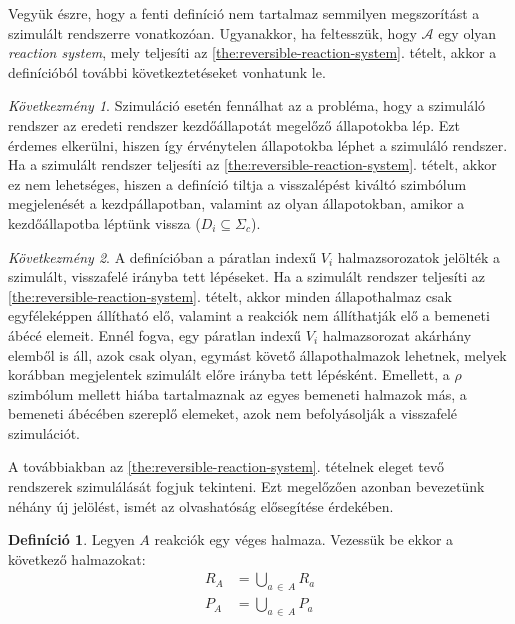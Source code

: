 \documentclass[12pt]{article}
\theoremstyle{definition}
\newtheorem*{definition*}{Definíció}
\theoremstyle{remark}
\theoremstyle{plain}
\theoremstyle{remark}
\newtheorem*{corollary*}{Következmény}
\theoremstyle{plain}
\begin{document}
    Vegyük észre, hogy a fenti definíció nem tartalmaz semmilyen megszorítást a szimulált rendszerre vonatkozóan. Ugyanakkor, ha feltesszük, hogy $\mathscr{A}$ egy olyan \textit{reaction system}, mely teljesíti az \ref{the:reversible-reaction-system}. tételt, akkor a definícióból további következtetéseket vonhatunk le.

    \begin{corollary*}
        Szimuláció esetén fennálhat az a probléma, hogy a szimuláló rendszer az eredeti rendszer kezdőállapotát megelőző állapotokba lép. Ezt érdemes elkerülni, hiszen így érvénytelen állapotokba léphet a szimuláló rendszer. Ha a szimulált rendszer teljesíti az \ref{the:reversible-reaction-system}. tételt, akkor ez nem lehetséges, hiszen a definíció tiltja a visszalépést kiváltó szimbólum megjelenését a kezdpállapotban, valamint az olyan állapotokban, amikor a kezdőállapotba léptünk vissza ($D_{i} \subseteq \Sigma_{c}$).
    \end{corollary*}

    \begin{corollary*}
        A definícióban a páratlan indexű $V_{i}$ halmazsorozatok jelölték a szimulált, visszafelé irányba tett lépéseket. Ha a szimulált rendszer teljesíti az \ref{the:reversible-reaction-system}. tételt, akkor minden állapothalmaz csak egyféleképpen állítható elő, valamint a reakciók nem állíthatják elő a bemeneti ábécé elemeit. Ennél fogva, egy páratlan indexű $V_{i}$ halmazsorozat akárhány elemből is áll, azok csak olyan, egymást követő állapothalmazok lehetnek, melyek korábban megjelentek szimulált előre irányba tett lépésként. Emellett, a $\rho$ szimbólum mellett hiába tartalmaznak az egyes bemeneti halmazok más, a bemeneti ábécében szereplő elemeket, azok nem befolyásolják a visszafelé szimulációt.
    \end{corollary*}

    A továbbiakban az \ref{the:reversible-reaction-system}. tételnek eleget tevő rendszerek szimulálását fogjuk tekinteni. Ezt megelőzően azonban bevezetünk néhány új jelölést, ismét az olvashatóság elősegítése érdekében.

    \begin{definition*}
        Legyen $A$ reakciók egy véges halmaza. Vezessük be ekkor a következő halmazokat:
        \begin{align*}
            R_{A} &= \bigcup\limits_{a \,\in\, A} R_{a} \\
            P_{A} &= \bigcup\limits_{a \,\in\, A} P_{a}
        \end{align*}
    \end{definition*}
\end{document}
